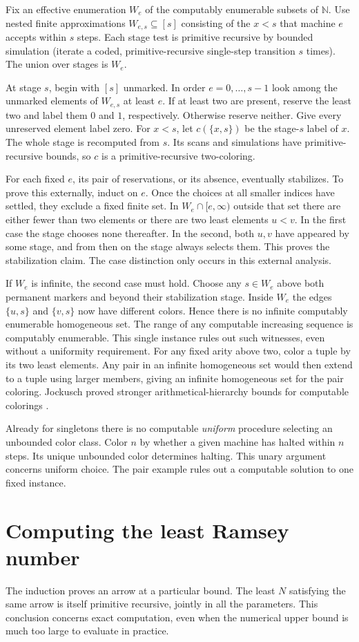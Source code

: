 \documentclass[11pt,letterpaper]{article}
\newcommand{\N}{\mathbb N}
\newcommand{\head}[1]{\section{#1}}
\newcommand{\point}[1]{\par\smallskip{\bfseries\color{ink}#1.}\enspace}
\begin{document}
\point{A coloring of pairs with no infinite computable solution} Fix an effective enumeration $W_e$ of the computably enumerable subsets of $\N$. Use nested finite approximations $W_{e,s}\subseteq[s]$ consisting of the $x<s$ that machine $e$ accepts within $s$ steps. Each stage test is primitive recursive by bounded simulation (iterate a coded, primitive-recursive single-step transition $s$ times). The union over stages is $W_e$.

At stage $s$, begin with $[s]$ unmarked. In order $e=0,\ldots,s-1$ look among the unmarked elements of $W_{e,s}$ at least $e$. If at least two are present, reserve the least two and label them $0$ and $1$, respectively. Otherwise reserve neither. Give every unreserved element label zero. For $x<s$, let $c(\{x,s\})$ be the stage-$s$ label of $x$. The whole stage is recomputed from $s$. Its scans and simulations have primitive-recursive bounds, so $c$ is a primitive-recursive two-coloring.

For each fixed $e$, its pair of reservations, or its absence, eventually stabilizes. To prove this externally, induct on $e$. Once the choices at all smaller indices have settled, they exclude a fixed finite set. In $W_e\cap[e,\infty)$ outside that set there are either fewer than two elements or there are two least elements $u<v$. In the first case the stage chooses none thereafter. In the second, both $u,v$ have appeared by some stage, and from then on the stage always selects them. This proves the stabilization claim. The case distinction only occurs in this external analysis.

If $W_e$ is infinite, the second case must hold. Choose any $s\in W_e$ above both permanent markers and beyond their stabilization stage. Inside $W_e$ the edges $\{u,s\}$ and $\{v,s\}$ now have different colors. Hence there is no infinite computably enumerable homogeneous set. The range of any computable increasing sequence is computably enumerable. This single instance rules out such witnesses, even without a uniformity requirement. For any fixed arity above two, color a tuple by its two least elements. Any pair in an infinite homogeneous set would then extend to a tuple using larger members, giving an infinite homogeneous set for the pair coloring. Jockusch proved stronger arithmetical-hierarchy bounds for computable colorings \cite{jockusch}.

Already for singletons there is no computable \emph{uniform} procedure selecting an unbounded color class. Color $n$ by whether a given machine has halted within $n$ steps. Its unique unbounded color determines halting. This unary argument concerns uniform choice. The pair example rules out a computable solution to one fixed instance.
\clearpage
\head{Computing the least Ramsey number}\label{s:least}
The induction proves an arrow at a particular bound. The least $N$ satisfying the same arrow is itself primitive recursive, jointly in all the parameters. This conclusion concerns exact computation, even when the numerical upper bound is much too large to evaluate in practice.
\end{document}
